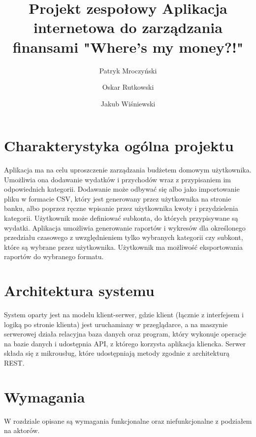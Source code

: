 \documentclass{article}
\title{\Huge{
		\indexspace Projekt zespołowy \indexspace Aplikacja internetowa do zarządzania finansami \indexspace \textbf{"Where's my money?!"}}}
\author{Patryk Mroczyński \and Oskar Rutkowski \and Jakub Wiśniewski}
\begin{document}
	
	\maketitle
	\newpage
	\tableofcontents
	\newpage
	
	\section{Charakterystyka ogólna projektu}
	\paragraph{} Aplikacja ma na celu uproszczenie zarządzania budżetem domowym użytkownika. Umożliwia ona dodawanie wydatków i przychodów wraz z przypisaniem im odpowiednich kategorii. Dodawanie może odbywać się albo jako importowanie pliku w formacie CSV, który jest generowany przez użytkownika na stronie banku, albo poprzez ręczne wpisanie przez użytkownika kwoty i przydzielenia kategorii. Użytkownik może definiować subkonta, do których przypisywane są wydatki. Aplikacja umożliwia generowanie raportów i wykresów dla określonego przedziału czasowego z uwzględnieniem tylko wybranych kategorii czy subkont, które są wybrane przez użytkownika. Użytkownik ma możliwość eksportowania raportów do wybranego formatu.
	\section{Architektura systemu}
	\paragraph{} System oparty jest na modelu klient-serwer, gdzie klient (łącznie z interfejsem i logiką po stronie klienta) jest uruchamiany w przeglądarce, a na maszynie serwerowej działa relacyjna baza danych oraz program, który wykonuje operacje na bazie danych i udostępnia API, z którego korzysta aplikacja kliencka. Serwer składa się z mikrousług, które udostępniają metody zgodnie z architekturą REST. 
	\section{Wymagania}
	\paragraph{} W rozdziale opisane są wymagania funkcjonalne oraz niefunkcjonalne z podziałem na aktorów.
\end{document}
